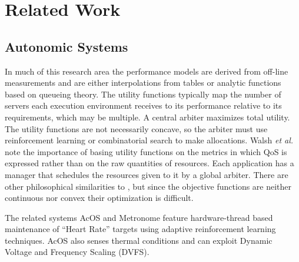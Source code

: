 \section{Related Work}

\subsection{Autonomic Systems}
%	
%
%	
%
In much of this research area\cite{1078472,1078493,1285843,1345325}
the performance models are derived from off-line measurements and are either
interpolations from tables or analytic functions based on queueing theory.
The utility functions typically map the number of servers each execution environment receives
to its performance relative to its requirements, which may be multiple.
A central arbiter maximizes total utility. The utility functions are not necessarily concave,
so the arbiter must use reinforcement learning or combinatorial search to make allocations.
%
Walsh \emph{et al.}\cite{1078411} note the importance of basing utility functions
on the metrics in which QoS is expressed rather than on the raw quantities of resources.
Each application has a manager that schedules the resources given to it by a global arbiter.
There are other philosophical similarities to \pacora,
but since the objective functions are neither continuous nor convex their optimization is difficult.

%
%
The related systems AcOS\cite{AcOS} and Metronome\cite{Metronome} feature hardware-thread based maintenance of ``Heart Rate''
targets using adaptive reinforcement learning techniques.
AcOS also senses thermal conditions and can exploit Dynamic Voltage and Frequency Scaling (DVFS).

